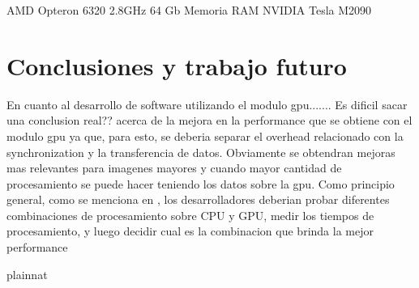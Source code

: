 \documentclass[a4paper,10pt]{report}
\begin{document}
AMD Opteron 6320  2.8GHz 
64 Gb Memoria RAM
NVIDIA Tesla M2090 

\chapter{Conclusiones y trabajo futuro}



En cuanto al desarrollo de software utilizando el modulo gpu.......
Es dificil sacar una conclusion   real??  acerca de la mejora en la performance que se obtiene con el modulo gpu ya que, para esto, se deberia separar el overhead relacionado con la synchronization y la transferencia de datos.
Obviamente se obtendran mejoras mas relevantes para imagenes mayores y cuando mayor cantidad de procesamiento se puede hacer teniendo los datos sobre la gpu.
Como principio general, como se menciona en  \cite{pulli2012real}  , los desarrolladores deberian probar diferentes combinaciones de procesamiento sobre CPU y GPU, medir los tiempos de procesamiento, y luego decidir cual es la combinacion que brinda la mejor performance





 {plainnat}




  
\end{document}
